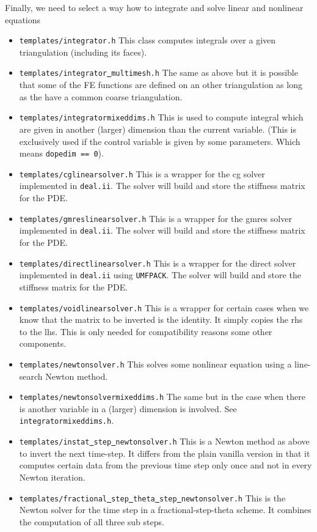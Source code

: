 Finally, we need to select a way how to integrate and solve linear and nonlinear equations
\begin{itemize}
\item {\tt templates/integrator.h} This class computes integrals over a given 
  triangulation (including its faces).
\item {\tt templates/integrator\underline{ }multimesh.h} The same as above but it is 
  possible that some of the FE functions are defined on an other triangulation 
  as long as the have a common coarse triangulation.
\item {\tt templates/integratormixeddims.h} This is used to compute integral which 
  are given in another (larger) dimension than the current variable. (This is exclusively
  used if the control variable is given by some parameters. Which means {\tt dopedim == 0}). 
\item {\tt templates/cglinearsolver.h} This is a wrapper for the cg solver implemented in 
  {\tt deal.ii}. The solver will build and store the stiffness matrix for the PDE.
\item {\tt templates/gmreslinearsolver.h} This is a wrapper for the gmres solver 
  implemented in {\tt deal.ii}. The solver will build and store the stiffness matrix 
  for the PDE.
\item {\tt templates/directlinearsolver.h} This is a wrapper for the direct solver 
  implemented in {\tt deal.ii} using {\tt UMFPACK}. 
  The solver will build and store the stiffness matrix for the PDE.
\item {\tt templates/voidlinearsolver.h} This is a wrapper for certain cases when we 
  know that the matrix to be inverted is the identity. It simply copies the rhs to the
  lhs. This is only needed for compatibility reasons some other components.
\item {\tt templates/newtonsolver.h} This solves some nonlinear equation using a 
  line-search Newton method.
\item {\tt templates/newtonsolvermixeddims.h} The same but in the case when there is 
  another variable in a (larger) dimension is involved. See 
  {\tt integratormixeddims.h}.
\item {\tt templates/instat\underline{ }step\underline{ }newtonsolver.h} This is a 
  Newton method as above to invert the next time-step. It differs from the plain vanilla
  version in that it computes certain data from the previous time step only once 
  and not in every Newton iteration.
\item {\tt templates/fractional\underline{ }step\underline{ }theta\underline{ }step\underline{ }newtonsolver.h} This is the Newton solver for the time step in a 
  fractional-step-theta scheme. It combines the computation of all three sub steps.
\end{itemize}

